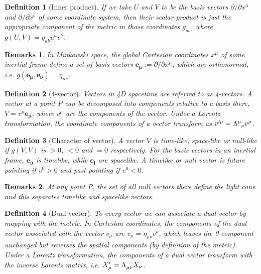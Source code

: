\documentclass[a4paper]{article}
\newtheorem{remarks}{Remarks}[section]
\theoremstyle{new}
\newtheorem{defi}{Definition}[section]
\begin{document}
\begin{defi}[Inner product]
If we take $U$ and $V$ to be the basis vectors $\partial/\partial x^a$ and $\partial/\partial x^b$ of some coordinate system, then their scalar product is just the appropriate component of the metric in those coordinates $g_{ab}$, where $g(U,V)=g_{ab}u^av^b$.
\end{defi}
\begin{remarks}
In Minkowski space, the global Cartesian coordinates $x^\mu$ of some inertial frame define a set of basis vectors $\mathbf{e_\mu}:=\partial/\partial x^\mu$, which are orthonormal, i.e. $g(\mathbf{e_\mu},\mathbf{e_\nu})=\eta_{\mu\nu}$.
\end{remarks}
\begin{defi}[4-vector]
Vectors in 4D spacetime are referred to as 4-vectors. A vector at a point P can be decomposed into components relative to a basis there, $V=v^\mu\mathbf{e_\mu}$, where $v^\mu$ are the components of the vector. Under a Lorentz transformation, the coordinate components of a vector transform as $v'^\mu=\tensor*{\Lambda}{*_{}^{\mu}_{\nu}}v^\mu$.
\end{defi}
\begin{defi}[Character of vector]
A vector $V$ is time-like, space-like or null-like if $g(V,V)$ is $>0$, $<0$ and $=0$ respectively. For the basis vectors in an inertial frame, $\mathbf{e_0}$ is timelike, while $\mathbf{e_i}$ are spacelike. A timelike or null vector is future pointing if $v^0>0$ and past pointing if $v^0<0$.
\end{defi}
\begin{remarks}
At any point P, the set of all null vectors there define the light cone and this separates timelike and spacelike vectors.
\end{remarks}
\begin{defi}[Dual vector]
To every vector we can associate a dual vector by mapping with the metric. In Cartesian coordinates, the components of the dual vector associated with the vector $v_\mu$ are $v_\mu=\eta_{\mu\nu}v^\nu$, which leaves the 0-component unchanged but reverses the spatial components (by definition of the metric). Under a Lorentz transformation, the components of a dual vector transform with the inverse Lorentz matrix, i.e. $X'_\mu=\tensor*{\Lambda}{*^{}_{\mu}_{\nu}}X_\nu$.
\end{defi}
\end{document}
